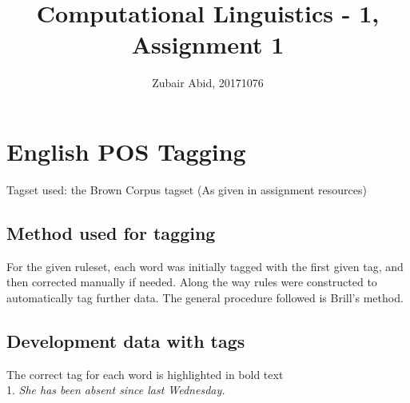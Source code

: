 \documentclass[11pt,a4paper,twocolumn]{article}
\title{Computational Linguistics - 1, Assignment 1}
\author{Zubair Abid, 20171076}
\date{}
\begin{document}
	
	\section{English POS Tagging}
	Tagset used: the Brown Corpus tagset (As given in assignment resources)\\
	\subsection{Method used for tagging}
	For the given ruleset, each word was initially tagged
	with the first given tag, and then corrected manually
	if needed. Along the way rules were constructed to
	automatically tag further data. The general procedure 
	followed is Brill's method.
	
	\subsection{Development data with tags}
	The correct tag for each word is highlighted in bold text\\
	$ $\\
	1. \textit{She has been absent since last Wednesday.}\\
	
\end{document}
